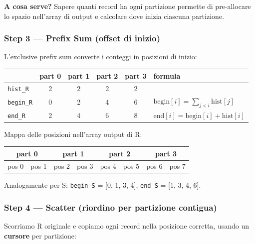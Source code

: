 \documentclass[11pt,a4paper]{article}
\begin{document}
\textbf{A cosa serve?} Sapere quanti record ha ogni partizione permette di pre-allocare lo spazio nell'array di output e calcolare dove inizia ciascuna partizione.

\subsubsection{Step 3 --- Prefix Sum (offset di inizio)}

L'exclusive prefix sum converte i conteggi in posizioni di inizio:

\begin{center}
\begin{tabular}{l|cccc|l}
& part 0 & part 1 & part 2 & part 3 & formula\\\hline
\texttt{hist\_R}  & 2 & 2 & 2 & 2 &\\
\texttt{begin\_R} & 0 & 2 & 4 & 6 & $\text{begin}[i] = \sum_{j<i}\text{hist}[j]$\\
\texttt{end\_R}   & 2 & 4 & 6 & 8 & $\text{end}[i] = \text{begin}[i] + \text{hist}[i]$
\end{tabular}
\end{center}

Mappa delle posizioni nell'array output di R:
\begin{center}
\small
\begin{tabular}{|c|c||c|c||c|c||c|c|}
\hline
\multicolumn{2}{|c||}{\cellcolor{blue!10}part 0} &
\multicolumn{2}{c||}{\cellcolor{green!10}part 1} &
\multicolumn{2}{c||}{\cellcolor{orange!10}part 2} &
\multicolumn{2}{c|}{\cellcolor{red!10}part 3} \\\hline
pos 0 & pos 1 & pos 2 & pos 3 & pos 4 & pos 5 & pos 6 & pos 7\\\hline
\end{tabular}
\end{center}

Analogamente per S: \texttt{begin\_S} = [0, 1, 3, 4], \;\texttt{end\_S} = [1, 3, 4, 6].

\subsubsection{Step 4 --- Scatter (riordino per partizione contigua)}

Scorriamo R originale e copiamo ogni record nella posizione corretta, usando un \textbf{cursore} per partizione:
\end{document}
